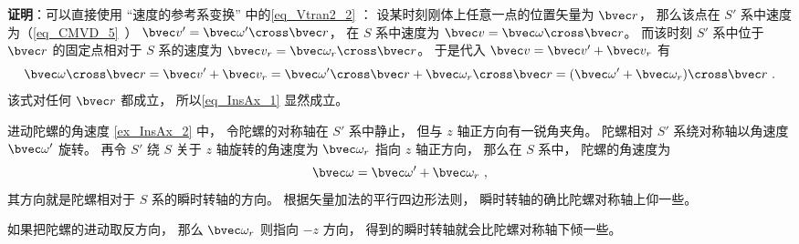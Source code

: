 \textbf{证明}：可以直接使用 “速度的参考系变换” 中的\autoref{eq_Vtran2_2} ： 设某时刻刚体上任意一点的位置矢量为 $\bvec r$， 那么该点在 $S'$ 系中速度为（\autoref{eq_CMVD_5}~） $\bvec v' = \bvec\omega'\cross\bvec r$， 在 $S$ 系中速度为 $\bvec v = \bvec\omega\cross\bvec r$。 而该时刻 $S'$ 系中位于 $\bvec r$ 的固定点相对于 $S$ 系的速度为 $\bvec v_r = \bvec\omega_r\cross\bvec r$。 于是代入 $\bvec v = \bvec v' + \bvec v_r$ 有
\begin{equation}
\bvec\omega\cross\bvec r = \bvec v' + \bvec v_r = \bvec\omega'\cross\bvec r + \bvec\omega_r\cross\bvec r
= (\bvec\omega' + \bvec\omega_r)\cross\bvec r~.
\end{equation}
该式对任何 $\bvec r$ 都成立， 所以\autoref{eq_InsAx_1} 显然成立。

\begin{example}{进动陀螺的角速度}\label{ex_InsAx_1}
\autoref{ex_InsAx_2} 中， 令陀螺的对称轴在 $S'$ 系中静止， 但与 $z$ 轴正方向有一锐角夹角。 陀螺相对 $S'$ 系绕对称轴以角速度 $\bvec \omega'$ 旋转。 再令 $S'$ 绕 $S$ 关于 $z$ 轴旋转的角速度为 $\bvec \omega_r$ 指向 $z$ 轴正方向， 那么在 $S$ 系中， 陀螺的角速度为
\begin{equation}
\bvec \omega = \bvec \omega' + \bvec \omega_r~,
\end{equation}
其方向就是陀螺相对于 $S$ 系的瞬时转轴的方向。 根据矢量加法的平行四边形法则， 瞬时转轴的确比陀螺对称轴上仰一些。

如果把陀螺的进动取反方向， 那么 $\bvec \omega_r$ 则指向 $-z$ 方向， 得到的瞬时转轴就会比陀螺对称轴下倾一些。
\end{example}
